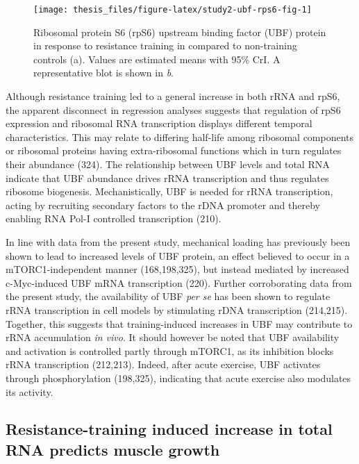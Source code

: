 \documentclass[twoside,10pt]{gihclass} %
\begin{document}
\begin{figure}

{\centering \texttt{[image: thesis\_files/figure-latex/study2-ubf-rps6-fig-1]} 

}

\caption[UBF and rpS6 protein in response to resistance training in Study II.]{Ribosomal protein S6 (rpS6) upstream binding factor (UBF) protein in response to resistance training in compared to non-training controls (a). Values are estimated means with 95\% CrI. A representative blot is shown in \textit{b}.}\label{fig:study2-ubf-rps6-fig}
\end{figure}
Although resistance training led to a general increase in both rRNA and rpS6, the apparent disconnect in regression analyses suggests that regulation of rpS6 expression and ribosomal RNA transcription displays different temporal characteristics. This may relate to differing half-life among ribosomal components or ribosomal proteins having extra-ribosomal functions which in turn regulates their abundance
(324).
The relationship between UBF levels and total RNA indicate that UBF abundance drives rRNA transcription and thus regulates ribosome biogenesis.
Mechanistically, UBF is needed for rRNA transcription, acting by recruiting secondary factors to the rDNA promoter and thereby enabling RNA Pol-I controlled transcription
(210).

In line with data from the present study, mechanical loading has previously been shown to lead to increased levels of UBF protein, an effect believed to occur in a mTORC1-independent manner
(168,198,325),
but instead mediated by increased c-Myc-induced UBF mRNA transcription (220).
Further corroborating data from the present study, the availability of UBF \emph{per se} has been shown to regulate rRNA transcription in cell models by stimulating rDNA transcription
(214,215).
Together, this suggests that training-induced increases in UBF may contribute to rRNA accumulation \emph{in vivo}.
It should however be noted that UBF availability and activation is controlled partly through mTORC1, as its inhibition blocks rRNA transcription
(212,213).
Indeed, after acute exercise, UBF activates through phosphorylation
(198,325),
indicating that acute exercise also modulates its activity.

\hypertarget{resistance-training-induced-increase-in-total-rna-predicts-muscle-growth}{%
\subsection{Resistance-training induced increase in total RNA predicts muscle growth}\label{resistance-training-induced-increase-in-total-rna-predicts-muscle-growth}}
\end{document}
